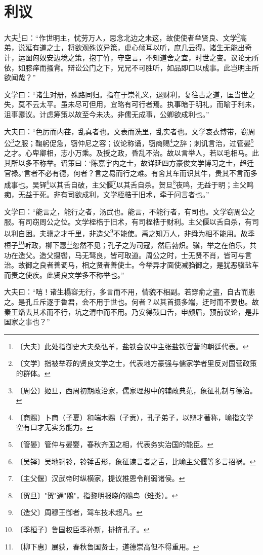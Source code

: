 \documentclass[12pt,UTF-8,openany,a4]{ctexbook}
\begin{document}
\chapter{利议}

\begin{large}
    
    大夫\footnote{〔大夫〕\yiwen 此处指御史大夫桑弘羊，盐铁会议中主张盐铁官营的朝廷代表。}曰：“作世明主，忧劳万人，思念北边之未这，故使使者举贤良、文学\footnote{〔文学〕\yiwen 指被举荐的贤良文学之士，代表地方豪强与儒家学者里反对国营政策的群体。}高弟，说延有道之士，将欲观殊议异策，虚心倾耳以听，庶几云得。诸生无能出奇计，运图匈奴安边境之策，抱丁竹，守空言，不知道舍之宜，时世之变。议论无所依，如膝痒而搔背。辩讼公门之下，兄兄不可胜听，如品即口以成事。此岂明主所欲闻哉？”
    
    文学曰：“诸生对册，殊路同归。指在于崇礼义，退财利，复往古之道，匡当世之失，莫不云太平。虽未尽可但用，宜略有可行者焉。执事暗于明礼，而喻于利未，沮事隳议。计虑筹策以故至今未决。非儒无成事，公卿欲成利也。”
    
    大夫曰：“色厉而内荏，乱真者也。文表而洗里，乱实者也。文学哀衣博带，窃周公\footnote{〔周公〕\yiwen 姬旦，西周初期政治家，儒家理想中的辅政典范，象征礼制与德治。}之服；鞠躬促急，窃仲尼之容；议论称诵，窃商赐\footnote{〔商赐〕\yiwen 卜商（子夏）和端木赐（子贡），孔子弟子，以辩才著称，喻指文学空有口才无实务能力。}之辞；刺讥言治，过管晏\footnote{〔管晏〕\yiwen 管仲与晏婴，春秋齐国之相，代表务实治国的能臣。}之才。心卑卿相，志小万乘。及授之政，昏乱不治。故以言举人，若以毛相马。此其所以多不称举。诏策曰：‘陈嘉宇内之士，故详延四方豪俊文学博习之士，趋迁官禄。’言者不必有德，何者？言之易而行之难。有舍其车而识其牛，贵其不言而多成事也。吴铎\footnote{〔吴铎〕\yiwen 吴地铜铃，铃锤舌形，象征谏言者之舌，比喻主父偃等多言招祸。}以其舌自破，主父偃\footnote{〔主父偃〕\yiwen 汉武帝时纵横家，提议推恩令削弱诸侯。}以其舌自杀。贺旦\footnote{〔贺旦〕\yiwen "贺"通"鶡"，指黎明报晓的鶡鸟（雉类）。}夜鸣，无益于明；主父鸣痴，无益于死。非有司欲成利，文学桎梏于旧术，牵于问言者也。”
    
    文学曰：“能言之，能行之者，汤武也。能言，不能行者，有司也。文学窃周公之服。有司窃周公之位。文学桎梏于旧术，有司桎梏于财利。主父偃以舌自杀，有司以利自困。夫骥之才千里，非造父\footnote{〔造父〕\yiwen 周穆王御者，驾车技术超凡。}不能使。禹之知万人，非舜为相不能用。故季桓子\footnote{〔季桓子〕\yiwen 鲁国权臣季孙斯，排挤孔子。}听政，柳下惠\footnote{〔柳下惠〕\yiwen 展获，春秋鲁国贤士，道德崇高但不得重用。}忽然不见；孔子之为司寇，然后勃炽。骥，举之在伯乐，共功在造父。造父摄辔，马无驽良，皆可取道。周公之时，士无贤不肖，皆可与言治。故御之良者善调马，相之贤者善使士。今举异才面使减驺御之，是犹恶骥盐车而责之使疾。此贤良文学多不称举也。”
    
    大夫曰：“嘻！诸生榻容无行，多言而不用，情貌不相副。若穿俞之盗，自古而患之。是孔丘斥逐于鲁君，会不用于世也。何者？以其首摄多端，迂时而不要也。故秦王燔去其术而不行，坑之渭中而不用。乃安得鼓口舌，申颜眉，预前议论，是非国家之事也？”
\end{large}
\end{document}
